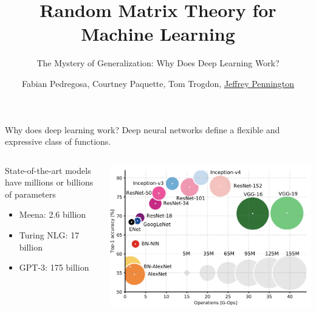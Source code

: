 \documentclass[10pt, aspectratio=169]{beamer}
\title{Random Matrix Theory for Machine Learning}
\subtitle{The Mystery of Generalization: Why Does Deep Learning Work?}
\date{}
\author{Fabian Pedregosa, Courtney Paquette, Tom Trogdon, \underline{Jeffrey Pennington}}
\institute{\url{https://random-matrix-learning.github.io}}
\begin{document}
\maketitle




\begin{frame}[t]{Why does deep learning work?}
Deep neural networks define a flexible and expressive class of functions.
\begin{columns}
\begin{column}{0.5\linewidth}
State-of-the-art models have millions or billions of parameters
\begin{itemize}
    \item Meena: 2.6 billion
    \item Turing NLG: 17 billion
    \item GPT-3: 175 billion
\end{itemize}
\end{column}
\begin{column}{0.4\linewidth}
\begin{center}
    \includegraphics[width=0.75\linewidth]{part-4-images/image-model-scaling.png}
        

\end{center}
\end{column}
\end{columns}
\end{frame}
\end{document}
